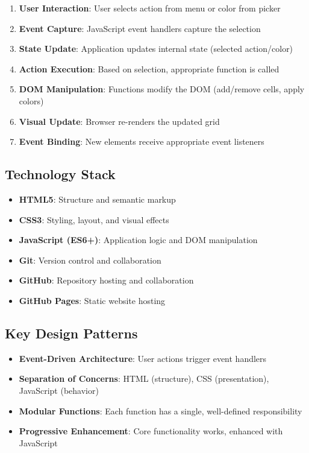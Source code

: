 \documentclass[11pt,a4paper]{article}
\begin{document}
\begin{enumerate}[leftmargin=*]
    \item \textbf{User Interaction}: User selects action from menu or color from picker
    \item \textbf{Event Capture}: JavaScript event handlers capture the selection
    \item \textbf{State Update}: Application updates internal state (selected action/color)
    \item \textbf{Action Execution}: Based on selection, appropriate function is called
    \item \textbf{DOM Manipulation}: Functions modify the DOM (add/remove cells, apply colors)
    \item \textbf{Visual Update}: Browser re-renders the updated grid
    \item \textbf{Event Binding}: New elements receive appropriate event listeners
\end{enumerate}

\subsection{Technology Stack}

\begin{itemize}[leftmargin=*]
    \item \textbf{HTML5}: Structure and semantic markup
    \item \textbf{CSS3}: Styling, layout, and visual effects
    \item \textbf{JavaScript (ES6+)}: Application logic and DOM manipulation
    \item \textbf{Git}: Version control and collaboration
    \item \textbf{GitHub}: Repository hosting and collaboration
    \item \textbf{GitHub Pages}: Static website hosting
\end{itemize}

\subsection{Key Design Patterns}

\begin{itemize}[leftmargin=*]
    \item \textbf{Event-Driven Architecture}: User actions trigger event handlers
    \item \textbf{Separation of Concerns}: HTML (structure), CSS (presentation), JavaScript (behavior)
    \item \textbf{Modular Functions}: Each function has a single, well-defined responsibility
    \item \textbf{Progressive Enhancement}: Core functionality works, enhanced with JavaScript
\end{itemize}
\end{document}
